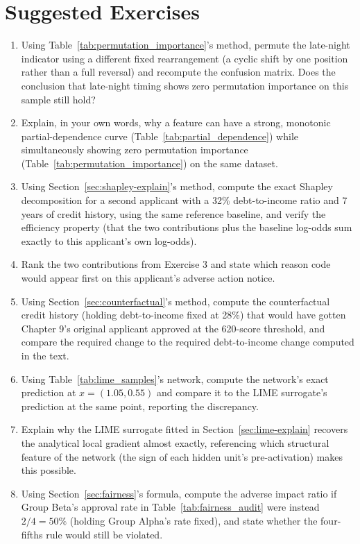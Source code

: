 \documentclass[../ai_in_finance]{subfiles}
\begin{document}
\section{Suggested Exercises}

\begin{enumerate}
    \item Using Table~\ref{tab:permutation_importance}'s method, permute the late-night indicator using a different fixed rearrangement (a cyclic shift by one position rather than a full reversal) and recompute the confusion matrix. Does the conclusion that late-night timing shows zero permutation importance on this sample still hold?
    \item Explain, in your own words, why a feature can have a strong, monotonic partial-dependence curve (Table~\ref{tab:partial_dependence}) while simultaneously showing zero permutation importance (Table~\ref{tab:permutation_importance}) on the same dataset.
    \item Using Section~\ref{sec:shapley-explain}'s method, compute the exact Shapley decomposition for a second applicant with a 32\% debt-to-income ratio and 7 years of credit history, using the same reference baseline, and verify the efficiency property (that the two contributions plus the baseline log-odds sum exactly to this applicant's own log-odds).
    \item Rank the two contributions from Exercise 3 and state which reason code would appear first on this applicant's adverse action notice.
    \item Using Section~\ref{sec:counterfactual}'s method, compute the counterfactual credit history (holding debt-to-income fixed at 28\%) that would have gotten Chapter 9's original applicant approved at the 620-score threshold, and compare the required change to the required debt-to-income change computed in the text.
    \item Using Table~\ref{tab:lime_samples}'s network, compute the network's exact prediction at $x = (1.05, 0.55)$ and compare it to the LIME surrogate's prediction at the same point, reporting the discrepancy.
    \item Explain why the LIME surrogate fitted in Section~\ref{sec:lime-explain} recovers the analytical local gradient almost exactly, referencing which structural feature of the network (the sign of each hidden unit's pre-activation) makes this possible.
    \item Using Section~\ref{sec:fairness}'s formula, compute the adverse impact ratio if Group Beta's approval rate in Table~\ref{tab:fairness_audit} were instead $2/4 = 50\%$ (holding Group Alpha's rate fixed), and state whether the four-fifths rule would still be violated.

\end{enumerate}
\end{document}
